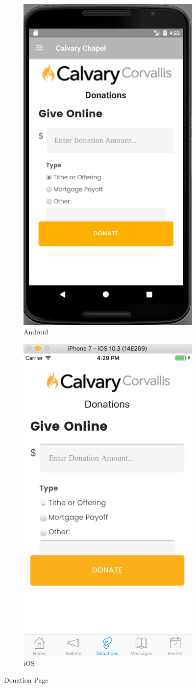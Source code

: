 \documentclass[letterpaper,10pt,draftclsnofoot,onecolumn,titlepage]{IEEEtran}
\begin{document}
		\begin{figure}[H]
			\centering
			\begin{subfigure}{.5\textwidth}
 				 \centering
  				 \includegraphics[width=.4\linewidth]{androiddonate}
 				 \caption{Android}
  				 \label{fig:sub1}
			\end{subfigure}%
			\begin{subfigure}{.5\textwidth}
		         	\centering
 				 \includegraphics[width=.4\linewidth]{iosdonate}
 				 \caption{iOS}
 				 \label{fig:sub2}
			\end{subfigure}
			\caption{Donation Page}
			\label{fig:donation}
		\end{figure}
\end{document}
